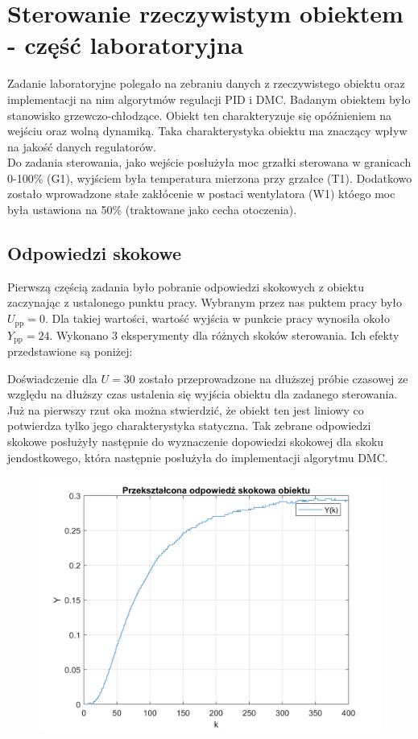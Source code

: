 \chapter{Sterowanie rzeczywistym obiektem - część laboratoryjna}
Zadanie laboratoryjne polegało na zebraniu danych z rzeczywistego obiektu oraz implementacji na nim algorytmów regulacji PID i DMC. Badanym obiektem było stanowisko grzewczo-chłodzące. Obiekt ten charakteryzuje się opóźnieniem na wejściu oraz wolną dynamiką. Taka charakterystyka obiektu ma znaczący wpływ na jakość danych regulatorów.\\
Do zadania sterowania, jako wejście posłużyła moc grzałki sterowana w granicach 0-100\% (G1), wyjściem była temperatura mierzona przy grzałce (T1). Dodatkowo zostało wprowadzone stałe zakłócenie w postaci wentylatora (W1) któego moc była ustawiona na 50\% (traktowane jako cecha otoczenia).
\section{Odpowiedzi skokowe}
Pierwszą częścią zadania było pobranie odpowiedzi skokowych z obiektu zaczynając z ustalonego punktu pracy. Wybranym przez nas puktem pracy było $U_\mathrm{pp}=0$. Dla takiej wartości, wartość wyjścia w punkcie pracy wynosiła około $Y_\mathrm{pp}=24$. Wykonano 3 eksperymenty dla różnych skoków sterowania. Ich efekty przedstawione są poniżej:
\begin{figure}

\end{figure}
Doświadczenie dla $U=30$ zostało przeprowadzone na dłuższej próbie czasowej ze względu na dłuższy czas ustalenia się wyjścia obiektu dla zadanego sterowania. Już na pierwszy rzut oka można stwierdzić, że obiekt ten jest liniowy co potwierdza tylko jego charakterystyka statyczna. Tak zebrane odpowiedzi skokowe posłużyły następnie do wyznaczenie dopowiedzi skokowej dla skoku jendostkowego, która następnie posłużyła do implementacji algorytmu DMC.
\begin{figure}

%
 \includegraphics{./PLOTS/DMC_step_resp.png}
\end{figure}
\FloatBarrier
